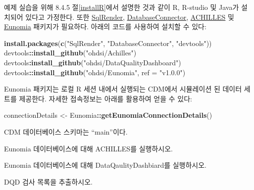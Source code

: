 \documentclass[11pt]{book}
\newenvironment{Shaded}{\begin{snugshade}}{\end{snugshade}}
\newcommand{\KeywordTok}[1]{\textcolor[rgb]{0.13,0.29,0.53}{\textbf{#1}}}
\newcommand{\DataTypeTok}[1]{\textcolor[rgb]{0.13,0.29,0.53}{#1}}
\newcommand{\StringTok}[1]{\textcolor[rgb]{0.31,0.60,0.02}{#1}}
\newcommand{\OperatorTok}[1]{\textcolor[rgb]{0.81,0.36,0.00}{\textbf{#1}}}
\newcommand{\NormalTok}[1]{#1}
\theoremstyle{definition}
\theoremstyle{definition}
\theoremstyle{definition}
\theoremstyle{remark}
\let\BeginKnitrBlock\begin \let\EndKnitrBlock\end
\begin{document}
예제 실습을 위해 8.4.5 절\ref{installR}에서 설명한 것과 같이 R, R-studio
및 Java가 설치되어 있다고 가정한다. 또한
\href{https://ohdsi.github.io/SqlRender/}{SqlRender},
\href{https://ohdsi.github.io/DatabaseConnector/}{DatabaseConnector},
\href{https://github.com/OHDSI/Achilles}{ACHILLES} 및
\href{https://ohdsi.github.io/Eunomia/}{Eunomia} 패키지가 필요하다.
아래의 코드를 사용하여 설치할 수 있다:

\begin{Shaded}
\begin{Highlighting}[]
\KeywordTok{install.packages}\NormalTok{(}\KeywordTok{c}\NormalTok{(}\StringTok{"SqlRender"}\NormalTok{, }\StringTok{"DatabaseConnector"}\NormalTok{, }\StringTok{"devtools"}\NormalTok{))}
\NormalTok{devtools}\OperatorTok{::}\KeywordTok{install_github}\NormalTok{(}\StringTok{"ohdsi/Achilles"}\NormalTok{)}
\NormalTok{devtools}\OperatorTok{:}\KeywordTok{install_github}\NormalTok{(}\StringTok{"ohdsi/DataQualityDashboard"}\NormalTok{)}
\NormalTok{devtools}\OperatorTok{::}\KeywordTok{install_github}\NormalTok{(}\StringTok{"ohdsi/Eunomia"}\NormalTok{, }\DataTypeTok{ref =} \StringTok{"v1.0.0"}\NormalTok{)}
\end{Highlighting}
\end{Shaded}

Eunomia 패키지는 로컬 R 세션 내에서 실행되는 CDM에서 시뮬레이션 된
데이터 세트를 제공한다. 자세한 접속정보는 아래를 활용하여 얻을 수 있다:

\begin{Shaded}
\begin{Highlighting}[]
\NormalTok{connectionDetails <-}\StringTok{ }\NormalTok{Eunomia}\OperatorTok{::}\KeywordTok{getEunomiaConnectionDetails}\NormalTok{()}
\end{Highlighting}
\end{Shaded}

CDM 데이터베이스 스키마는 ``main''이다.

\BeginKnitrBlock{exercise}
\protect\hypertarget{exr:exerciseRunAchilles}{}{\label{exr:exerciseRunAchilles}
}Eunomia 데이터베이스에 대해 ACHILLES를 실행하시오.
\EndKnitrBlock{exercise}

\BeginKnitrBlock{exercise}
\protect\hypertarget{exr:exerciseRunDQD}{}{\label{exr:exerciseRunDQD}
}Eunomia 데이터베이스에 대해 DataQaulityDashbiard를 실행하시오.
\EndKnitrBlock{exercise}

\BeginKnitrBlock{exercise}
\protect\hypertarget{exr:exerciseViewDQD}{}{\label{exr:exerciseViewDQD} }DQD
검사 목록을 추출하시오.
\EndKnitrBlock{exercise}
\end{document}
